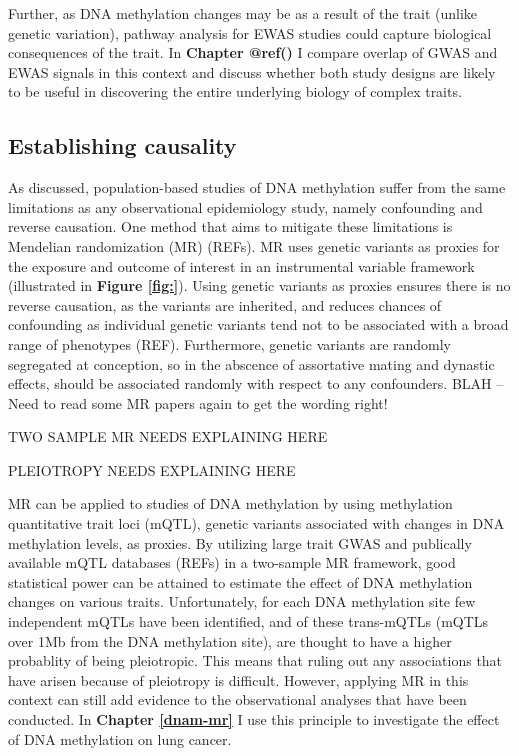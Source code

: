 \documentclass[11pt,twoside]{bristolthesis}
\begin{document}
Further, as DNA methylation changes may be as a result of the trait (unlike genetic variation), pathway analysis for EWAS studies could capture biological consequences of the trait. In \textbf{Chapter @ref()} I compare overlap of GWAS and EWAS signals in this context and discuss whether both study designs are likely to be useful in discovering the entire underlying biology of complex traits.

\hypertarget{establishing-causality}{%
\subsection{Establishing causality}\label{establishing-causality}}

As discussed, population-based studies of DNA methylation suffer from the same limitations as any observational epidemiology study, namely confounding and reverse causation. One method that aims to mitigate these limitations is Mendelian randomization (MR) (REFs). MR uses genetic variants as proxies for the exposure and outcome of interest in an instrumental variable framework (illustrated in \textbf{Figure \ref{fig:}}). Using genetic variants as proxies ensures there is no reverse causation, as the variants are inherited, and reduces chances of confounding as individual genetic variants tend not to be associated with a broad range of phenotypes (REF). Furthermore, genetic variants are randomly segregated at conception, so in the abscence of assortative mating and dynastic effects, should be associated randomly with respect to any confounders. BLAH -- Need to read some MR papers again to get the wording right!

TWO SAMPLE MR NEEDS EXPLAINING HERE

PLEIOTROPY NEEDS EXPLAINING HERE

MR can be applied to studies of DNA methylation by using methylation quantitative trait loci (mQTL), genetic variants associated with changes in DNA methylation levels, as proxies. By utilizing large trait GWAS and publically available mQTL databases (REFs) in a two-sample MR framework, good statistical power can be attained to estimate the effect of DNA methylation changes on various traits. Unfortunately, for each DNA methylation site few independent mQTLs have been identified, and of these trans-mQTLs (mQTLs over 1Mb from the DNA methylation site), are thought to have a higher probablity of being pleiotropic. This means that ruling out any associations that have arisen because of pleiotropy is difficult. However, applying MR in this context can still add evidence to the observational analyses that have been conducted. In \textbf{Chapter \ref{dnam-mr}} I use this principle to investigate the effect of DNA methylation on lung cancer.
\end{document}
